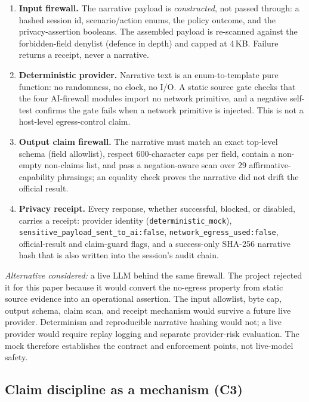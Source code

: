 \documentclass[conference]{IEEEtran}
\begin{document}
\begin{enumerate}
  \item \textbf{Input firewall.} The narrative payload is \emph{constructed},
    not passed through: a hashed session id, scenario/action enums, the policy
    outcome, and the privacy-assertion booleans. The assembled payload is
    re-scanned against the forbidden-field denylist (defence in depth) and capped
    at 4\,KB. Failure returns a receipt, never a narrative.
  \item \textbf{Deterministic provider.} Narrative text is an enum-to-template
    pure function: no randomness, no clock, no I/O. A static source gate checks
    that the four AI-firewall modules import no network primitive, and a negative
    self-test confirms the gate fails when a network primitive is injected. This
    is not a host-level egress-control claim.
  \item \textbf{Output claim firewall.} The narrative must match an exact
    top-level schema (field allowlist), respect 600-character caps per field,
    contain a non-empty non-claims list, and pass a negation-aware scan over 29
    affirmative-capability phrasings; an equality check proves the narrative did
    not drift the official result.
  \item \textbf{Privacy receipt.} Every response, whether successful, blocked, or
    disabled, carries a receipt: provider identity
    (\texttt{deterministic\_mock}), \texttt{sensitive\_payload\_sent\_to\_ai:false},
    \texttt{network\_egress\_used:false}, official-result and claim-guard flags,
    and a success-only SHA-256 narrative hash that is also written into the
    session's audit chain.
\end{enumerate}

\emph{Alternative considered:} a live LLM behind the same firewall. The project
rejected it for this paper because it would convert the no-egress property from
static source evidence into an operational assertion. The input allowlist, byte
cap, output schema, claim scan, and receipt mechanism would survive a future
live provider. Determinism and reproducible narrative hashing would not; a live
provider would require replay logging and separate provider-risk evaluation. The
mock therefore establishes the contract and enforcement points, not live-model
safety.

\subsection{Claim discipline as a mechanism (C3)}
\label{sec:c3}
\end{document}
